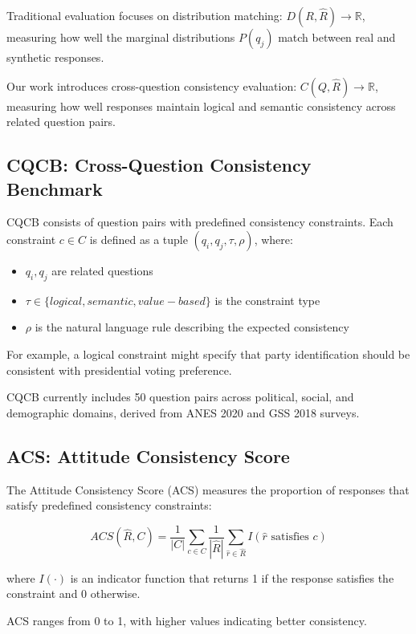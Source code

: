 \documentclass[sigconf, anonymous]{acmart}
\begin{document}
Traditional evaluation focuses on distribution matching: $D(R, \hat{R}) \rightarrow \mathbb{R}$, measuring how well the marginal distributions $P(q_j)$ match between real and synthetic responses.

Our work introduces cross-question consistency evaluation: $C(Q, \hat{R}) \rightarrow \mathbb{R}$, measuring how well responses maintain logical and semantic consistency across related question pairs.

\subsection{CQCB: Cross-Question Consistency Benchmark}

CQCB consists of question pairs with predefined consistency constraints. Each constraint $c \in C$ is defined as a tuple $(q_i, q_j, \tau, \rho)$, where:

\begin{itemize}
    \item $q_i, q_j$ are related questions
    \item $\tau \in \{logical, semantic, value-based\}$ is the constraint type
    \item $\rho$ is the natural language rule describing the expected consistency
\end{itemize}

For example, a logical constraint might specify that party identification should be consistent with presidential voting preference.

CQCB currently includes 50 question pairs across political, social, and demographic domains, derived from ANES 2020 and GSS 2018 surveys.

\subsection{ACS: Attitude Consistency Score}

The Attitude Consistency Score (ACS) measures the proportion of responses that satisfy predefined consistency constraints:

\[
ACS(\hat{R}, C) = \frac{1}{|C|} \sum_{c \in C} \frac{1}{|\hat{R}|} \sum_{\hat{r} \in \hat{R}} I(\hat{r} \text{ satisfies } c)
\]

where $I(\cdot)$ is an indicator function that returns 1 if the response satisfies the constraint and 0 otherwise.

ACS ranges from 0 to 1, with higher values indicating better consistency.
\end{document}
